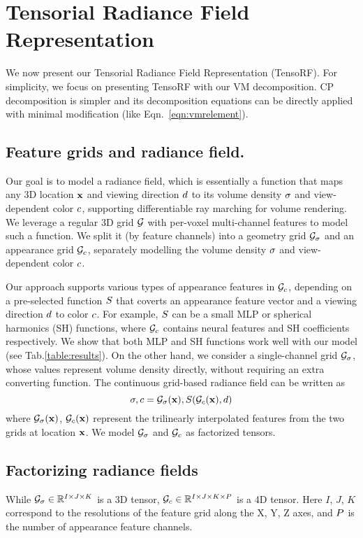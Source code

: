 \documentclass[runningheads]{llncs}
\begin{document}
\section{Tensorial Radiance Field Representation}
\label{sec:tensorf}
We now present our Tensorial Radiance Field Representation (TensoRF). For simplicity, we focus on presenting TensoRF with our VM decomposition. CP decomposition is simpler and its decomposition equations can be directly applied with minimal modification (like Eqn.~\ref{eqn:vmrelement}).

\subsection{Feature grids and radiance field.}
\label{sec:grids}
Our goal is to model a radiance field, which is essentially a function that maps any 3D location $\mathbf{x}$ and viewing direction $d$ to its volume density $\sigma$ and view-dependent color $c$, supporting differentiable ray marching for volume rendering.
We leverage a regular 3D grid $\mathcal{G}$ with per-voxel multi-channel features to model such a function. We split it (by feature channels) into a geometry grid $\mathcal{G}_\sigma$ and an appearance grid $\mathcal{G}_c$, separately modelling the volume density $\sigma$ and view-dependent color $c$.

Our approach supports various types of appearance features in $\mathcal{G}_c$, depending on a pre-selected function $S$ that coverts an appearance feature vector and a viewing direction $d$ to color $c$. For example, $S$ can be a small MLP or spherical harmonics (SH) functions, where $\mathcal{G}_c$ contains neural features and SH coefficients respectively.
We show that both MLP and SH functions work well with our model (see Tab.\ref{table:results}).
On the other hand, we consider a single-channel grid $\mathcal{G}_\sigma$, whose values represent volume density directly, without requiring an extra converting function. The continuous grid-based radiance field can be written as
\begin{equation}
    \sigma, c = \mathcal{G}_\sigma(\mathbf{x}), S(\mathcal{G}_c(\mathbf{x}),d)
    \label{eqn:rf}
\end{equation}
where $\mathcal{G}_\sigma(\mathbf{x})$, $\mathcal{G}_c(\mathbf{x})$ represent the trilinearly interpolated features from the two grids at location $\mathbf{x}$. 
We model $\mathcal{G}_\sigma$ and $\mathcal{G}_c$ as factorized tensors.






\subsection{Factorizing radiance fields}
While $\mathcal{G}_\sigma \in \mathbb{R}^{I\times J\times K}$ is a 3D tensor, $\mathcal{G}_c \in \mathbb{R}^{I\times J\times K\times P}$ is a 4D tensor. Here $I$, $J$, $K$ correspond to the resolutions of the feature grid along the X, Y, Z axes, and $P$ is the number of appearance feature channels. 
\end{document}
